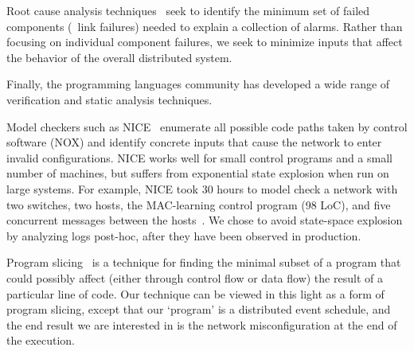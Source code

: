 Root cause analysis techniques~\cite{yemini1996} seek to identify the minimum set of failed
components (\eg~link failures) needed to explain a collection of alarms. Rather than
focusing on individual component failures, we seek to minimize inputs that affect the behavior
of the overall distributed system.


Finally, the programming languages community has developed
a wide range of verification and static analysis techniques.

Model checkers such as NICE~\cite{nice} enumerate all possible code paths taken by control software (NOX)
and identify concrete inputs that cause
the network to enter invalid configurations. NICE works well for small
control programs and a small number of machines, but suffers from exponential
state explosion when run on large systems. For example, NICE took 30 hours to
model check a network with two switches, two hosts, the MAC-learning
control program (98 LoC), and five concurrent
messages between the hosts~\cite{nice}. We chose to avoid state-space explosion by analyzing logs
post-hoc, after they have been observed in production.

Program slicing~\cite{weiser1981program} is a technique for finding the
minimal subset
of a program that could possibly affect (either through control flow or data
flow) the result of a particular line of code.
Our technique can be viewed in this light as a form of program slicing, except
that our `program' is a distributed event schedule,
and the end result we are interested in is the network misconfiguration at the end of the
execution.

